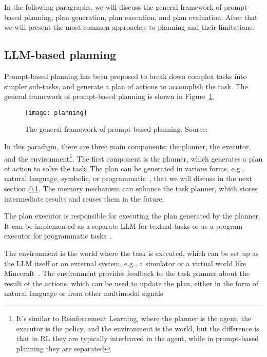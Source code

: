 In the following paragraphs, we will discuss the general framework of prompt-based planning, plan generation, plan execution, and plan evaluation.
After that we will present the most common approaches to planning and their limitations.

\subsection{LLM-based planning}
\label{subsec:plan-based}

Prompt-based planning has been proposed to break down complex tasks into simpler sub-tasks, and generate a plan of actions to accomplish the task.
The general framework of prompt-based planning is shown in Figure~\ref{fig:planning}.

\begin{figure}[h!]
	\centering
	\texttt{[image: planning]}
	\caption{The general framework of prompt-based planning. Source: \textcite{survey}}
	\label{fig:planning}
\end{figure}

In this paradigm, there are three main components: the planner, the executor, and the environment\footnote{It's similar to Reinforcement Learning, where the planner is the agent, the executor is the policy, and the environment is the world, but the difference is that in RL they are typically interleaved in the agent, while in prompt-based planning they are separated}.
The first component is the planner, which generates a plan of action to solve the task.
The plan can be generated in various forms, e.g., natural language, symbolic, or programmatic~\cite{gao2022pal, zhou2022least}, that we will discuss in the next section~\ref{subsec:plan-based}.
The memory mechanism can enhance the task planner, which stores intermediate results and reuses them in the future.

The plan executor is responsible for executing the plan generated by the planner.
It can be implemented as a separate LLM for textual tasks or as a program executor for programmatic tasks~\cite{wang2023plan, gao2022pal}.

The environment is the world where the task is executed, which can be set up as the LLM itself or an external system, e.g., a simulator or a virtual world like Minecraft~\cite{yao2023tree, wang2023voyager}.
The environment provides feedback to the task planner about the result of the actions, which can be used to update the plan, either in the form of natural language or from other multimodal signals~\cite{shinn2023reflexion, lu2023multimodal}

